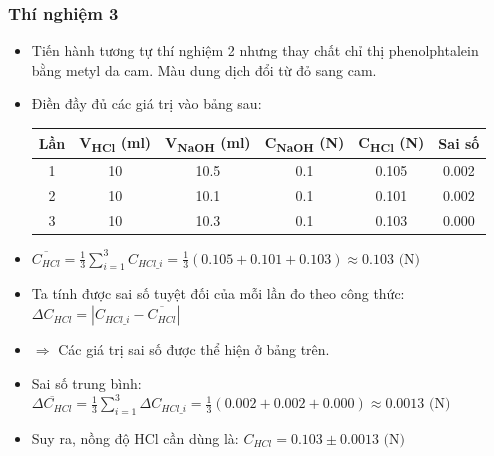 \subsubsection{Thí nghiệm 3}
\begin{itemize}
    \item Tiến hành tương tự thí nghiệm 2 nhưng thay chất chỉ thị phenolphtalein bằng metyl da cam. Màu dung dịch đổi từ đỏ sang cam.
    \item Điền đầy đủ các giá trị vào bảng sau:
    \begin{table}[H]
        \centering
        \begin{tabular}{|c|c|c|c|c|c|}
            \hline
            \textbf{Lần} & \textbf{V\textsubscript{HCl} (ml)} & \textbf{V\textsubscript{NaOH} (ml)} & \textbf{C\textsubscript{NaOH} (N)} & \textbf{C\textsubscript{HCl} (N)} & \textbf{Sai số} \\
            \hline
            1 & 10 & 10.5 & 0.1 & 0.105 & 0.002 \\
            \hline
            2 & 10 & 10.1 & 0.1 & 0.101 & 0.002 \\
            \hline
            3 & 10 & 10.3 & 0.1 & 0.103 & 0.000 \\
            \hline
        \end{tabular}
    \end{table}
    \item $\overline{C_{HCl}} = \frac{1}{3} \sum_{i=1}^{3} C_{HCl\_i} = \frac{1}{3}(0.105 + 0.101 + 0.103) \approx 0.103 \text{ (N)}$
    \item Ta tính được sai số tuyệt đối của mỗi lần đo theo công thức: $\Delta C_{HCl} = |C_{HCl\_i} - \overline{C_{HCl}}|$
    \item $\Rightarrow$ Các giá trị sai số được thể hiện ở bảng trên.
    \item Sai số trung bình: $\overline{\Delta C_{HCl}} = \frac{1}{3} \sum_{i=1}^{3} \Delta C_{HCl\_i} = \frac{1}{3}(0.002 + 0.002 + 0.000) \approx 0.0013 \text{ (N)}$
    \item Suy ra, nồng độ HCl cần dùng là: $C_{HCl} = 0.103 \pm 0.0013 \text{ (N)}$
\end{itemize}

